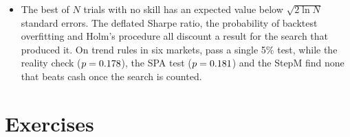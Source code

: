 \begin{chapterrefs}
\begin{itemize}
        markup by \hdPriceCutWw\%, against \hdPriceCutCost\% for the re-optimised rule without memory.
  \item The best of $N$ trials with no skill has an expected value below $\sqrt{2\ln N}$ standard errors.
        The deflated Sharpe ratio, the probability of backtest overfitting and Holm's procedure all
        discount a result for the search that produced it. On \mtRules{} trend rules in six markets,
        \mtNaiveFive{} pass a single 5\% test, while the reality check ($p=0.178$), the SPA test
        ($p=0.181$) and the StepM find none that beats cash once the search is counted.
\end{itemize}

\FloatBarrier
\section{Exercises}
\label{sec12:exercises}


\end{chapterrefs}
